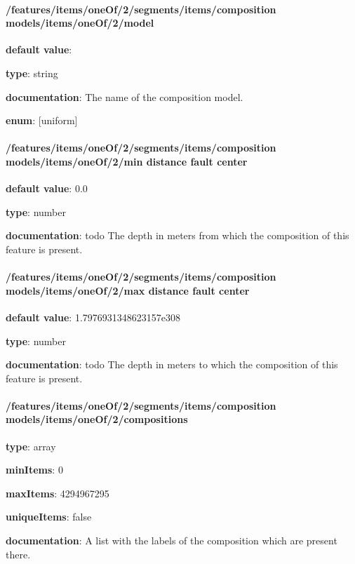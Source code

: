 \paragraph{/features/items/oneOf/2/segments/items/composition models/items/oneOf/2/model} \begin{itemized}
\item {\bf default value}: 
\item {\bf type}: string
\item {\bf documentation}: The name of the composition model.
\item {\bf enum}: [uniform]\end{itemized}\paragraph{/features/items/oneOf/2/segments/items/composition models/items/oneOf/2/min distance fault center} \begin{itemized}
\item {\bf default value}: 0.0
\item {\bf type}: number
\item {\bf documentation}: todo The depth in meters from which the composition of this feature is present.
\end{itemized}\paragraph{/features/items/oneOf/2/segments/items/composition models/items/oneOf/2/max distance fault center} \begin{itemized}
\item {\bf default value}: 1.7976931348623157e308
\item {\bf type}: number
\item {\bf documentation}: todo The depth in meters to which the composition of this feature is present.
\end{itemized}\paragraph{/features/items/oneOf/2/segments/items/composition models/items/oneOf/2/compositions} \begin{itemized}
\item {\bf type}: array
\item {\bf minItems}: 0
\item {\bf maxItems}: 4294967295
\item {\bf uniqueItems}: false
\item {\bf documentation}: A list with the labels of the composition which are present there.

\end{itemized}
